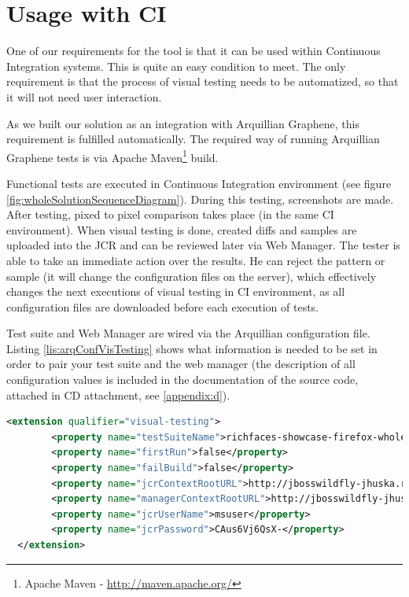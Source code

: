 \documentclass[11pt,oneside,final]{fithesis2}
\begin{document}
  \section{Usage with CI}
  One of our requirements for the tool is that it can be used within Continuous Integration systems. This is quite an easy condition to meet.
  The only requirement is that the process of visual testing needs to be automatized, so that it will not need user interaction.
  
  As we built our solution as an integration with Arquillian Graphene, this requirement is fulfilled automatically. The required way of running
  Arquillian Graphene tests is via Apache Maven\footnote{Apache Maven - \url{http://maven.apache.org/}} build.
  
  Functional tests are executed in Continuous Integration environment (see figure \ref{fig:wholeSolutionSequenceDiagram}). During this testing,
  screenshots are made. After testing, pixed to pixel comparison takes place (in the same CI environment). When visual testing is done, created
  diffs and samples are uploaded into the JCR and can be reviewed later via Web Manager. The tester is able to take an immediate action
  over the results. He can reject the pattern or sample (it will change the configuration files on the server), which effectively changes the next executions of 
  visual testing in CI environment, as all configuration files are downloaded before each execution of tests.
  
  Test suite and Web Manager are wired via the Arquillian configuration file. Listing \ref{lis:arqConfVisTesting} shows what information is needed 
  to be set in order to pair your test suite and the web manager (the description of all configuration values is included in the documentation
  of the source code, attached in CD attachment, see \ref{appendix:d}).
  \newpage
  \begin{lstlisting}[caption=Example of configuration for Graphene Visual Testing Extension,label=lis:arqConfVisTesting,breaklines=true, language=xml]
  <extension qualifier="visual-testing">
        <property name="testSuiteName">richfaces-showcase-firefox-whole</property>      
        <property name="firstRun">false</property>
        <property name="failBuild">false</property>
        <property name="jcrContextRootURL">http://jbosswildfly-jhuska.rhcloud.com/modeshape-rest/graphene-visual-testing/default</property>
        <property name="managerContextRootURL">http://jbosswildfly-jhuska.rhcloud.com/</property>
        <property name="jcrUserName">msuser</property>
        <property name="jcrPassword">CAus6Vj6QsX-</property>
  </extension>
  \end{lstlisting}
  
\end{document}
